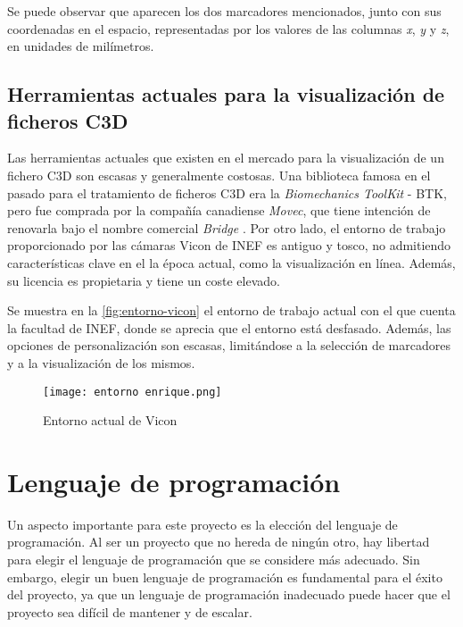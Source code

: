 Se puede observar que aparecen los dos marcadores mencionados, junto con sus coordenadas en el espacio, representadas por los valores de las columnas \textit{x}, \textit{y} y \textit{z}, en unidades de milímetros.

\subsection{Herramientas actuales para la visualización de ficheros \acs{C3D}}

Las herramientas actuales que existen en el mercado para la visualización de un fichero \ac{C3D} son escasas y generalmente costosas. Una biblioteca famosa en el pasado para el tratamiento de ficheros \ac{C3D} era la \textit{Biomechanics ToolKit} - BTK, pero fue comprada por la compañía canadiense \textit{Movec}, que tiene intención de renovarla bajo el nombre comercial \textit{Bridge} \autocite{Bridge,ProjectBiomechanicalToolKit}. Por otro lado, el entorno de trabajo proporcionado por las cámaras Vicon de \ac{INEF} es antiguo y tosco, no admitiendo características clave en el la época actual, como la visualización en línea. Además, su licencia es propietaria y tiene un coste elevado.

Se muestra en la \autoref{fig:entorno-vicon} el entorno de trabajo actual con el que cuenta la facultad de \ac{INEF}, donde se aprecia que el entorno está desfasado. Además, las opciones de personalización son escasas, limitándose a la selección de marcadores y a la visualización de los mismos.

\begin{figure}[H]
    \centering
    \texttt{[image: entorno enrique.png]}
    \caption{Entorno actual de Vicon}
    \label{fig:entorno-vicon}
\end{figure}

\section{Lenguaje de programación}

Un aspecto importante para este proyecto es la elección del lenguaje de programación. Al ser un proyecto que no hereda de ningún otro, hay libertad para elegir el lenguaje de programación que se considere más adecuado. Sin embargo, elegir un buen lenguaje de programación es fundamental para el éxito del proyecto, ya que un lenguaje de programación inadecuado puede hacer que el proyecto sea difícil de mantener y de escalar.


